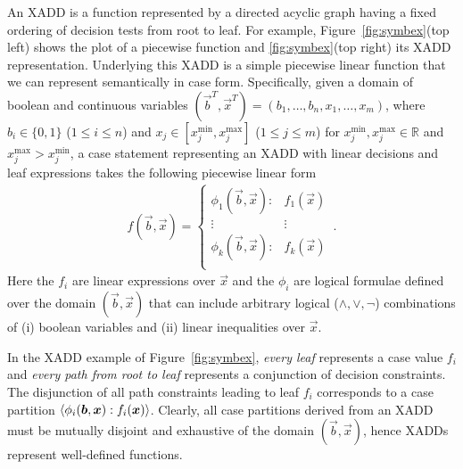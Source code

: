 

An XADD is a function represented by a directed acyclic graph having a
fixed ordering of decision tests from root to leaf.  For example,
Figure~\ref{fig:symbex}(top left) shows the plot of a piecewise function and
\ref{fig:symbex}(top right) its XADD representation.  Underlying this
XADD is a simple piecewise linear
function that we can represent semantically in case form.
Specifically, given a domain of boolean and continuous variables
$(\vec{b}^T,\vec{x}^T) = ( b_1,\ldots,b_n,x_{1},\ldots,x_m )$, where
$b_i \in \{ 0,1 \}$ ($1 \leq i \leq n$) and $x_j \in
[x_j^{\min},x_j^{\max}]$ ($1 \leq j \leq m$) for
$x_j^{\min},x_j^{\max} \in \mathbb{R}$ and $x_j^{\max} > x_j^{\min}$,
a case statement representing an XADD with linear decisions and leaf
expressions takes the following piecewise linear form {\footnotesize
\begin{align}
f(\vec{b},\vec{x}) = 
\begin{cases}
  \phi_1(\vec{b},\vec{x}): & f_1(\vec{x}) \\ 
 \vdots&\vdots\\ 
  \phi_k(\vec{b},\vec{x}): & f_k(\vec{x}) \\ 
\end{cases} \, . \label{eq:case}
\end{align}
} 
Here the $f_i$ are linear expressions over $\vec{x}$ and the $\phi_i$
are logical formulae defined over the domain $(\vec{b},\vec{x})$ that
can include arbitrary logical ($\land,\lor,\neg$) combinations of (i)
boolean variables and (ii) linear inequalities over $\vec{x}$.

In the XADD example of Figure~\ref{fig:symbex},  
\emph{every leaf} represents a case value $f_i$ and 
\emph{every path from root to leaf} represents a conjunction
of decision constraints.  The disjunction of all path constraints
leading to leaf $f_i$ corresponds to a case partition
$\langle \phi_i(\boldsymbol{b},\boldsymbol{x}) : f_i(\boldsymbol{x}) \rangle$.  Clearly, all case
partitions derived from an XADD must be mutually disjoint and
exhaustive of the domain $(\vec{b},\vec{x})$, hence XADDs
represent well-defined functions.

